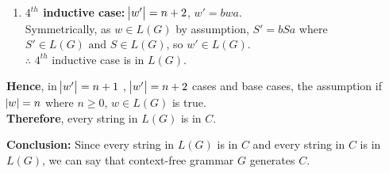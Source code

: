 \documentclass[11pt]{article}
\begin{document}
\begin{enumerate}
\begin{enumerate}
\begin{enumerate}
\begin{enumerate}
            \item \textbf{$4^{th}$ inductive case:} $\abs{w'} = n + 2$, $w' = bwa$. \\
            Symmetrically, as $w \in L(G)$ by assumption, $S' = bSa$ where $S' \in L(G) \text{ and } S \in L(G)$, so $w' \in L(G)$. \\
            $\therefore$ $4^{th}$ inductive case is in $L(G)$.
        \end{enumerate}
        
        \textbf{Hence}, in $\abs{w'} = n + 1$ , $\abs{w'} = n + 2$ cases and base cases, the assumption if $\abs{w} = n$ where $n \geq 0$, $w \in L(G)$ is true. \\
    \textbf{Therefore}, every string in $L(G)$ is in $C$. \\
    \end{enumerate}
    
\end{enumerate}

\textbf{Conclusion:} Since every string in $L(G)$ is in $C$ and every string in $C$ is in $L(G)$, we can say that context-free grammar $G$ generates $C$.

\end{enumerate}

\end{document}
